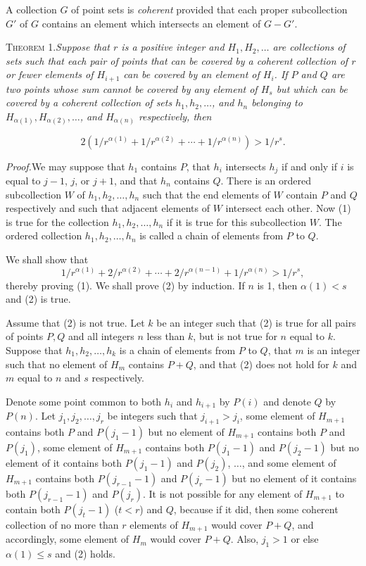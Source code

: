 \documentclass[11pt,a4paper,leqno,twoside]{article}
\newcommand{\thm}[2]{\par\medskip\noindent\textsc{Theorem #1.}\enspace\textit{#2}\par}
\newcommand{\proof}{\par\noindent\textit{Proof.}\enspace}
\begin{document}
A collection $G$ of point sets is \textit{coherent} provided that each proper subcollection $G'$ of $G$ contains an element which intersects an element of $G-G'$.

\thm{1}{Suppose that $r$ is a positive integer and $H_1,H_2,\ldots$ are collections of sets such that each pair of points that can be covered by a coherent collection of $r$ or fewer elements of $H_{i+1}$ can be covered by an element of $H_i$. If $P$ and $Q$ are two points whose sum cannot be covered by any element of $H_s$ but which can be covered by a coherent collection of sets $h_1,h_2,\ldots$, and $h_n$ belonging to $H_{\alpha(1)},H_{\alpha(2)},\ldots$, and $H_{\alpha(n)}$ respectively, then}
\begin{equation}\tag{1}2(1/r^{\alpha(1)}+1/r^{\alpha(2)}+\cdots+1/r^{\alpha(n)})>1/r^s.\end{equation}
\begingroup\renewcommand{\thefootnote}{}\endgroup
\newpage %
\proof We may suppose that $h_1$ contains $P$, that $h_i$ intersects $h_j$ if and only if $i$ is equal to $j-1$, $j$, or $j+1$, and that $h_n$ contains $Q$. There is an ordered subcollection $W$ of $h_1,h_2,\ldots,h_n$ such that the end elements of $W$ contain $P$ and $Q$ respectively and such that adjacent elements of $W$ intersect each other. Now (1) is true for the collection $h_1,h_2,\ldots,h_n$ if it is true for this subcollection $W$. The ordered collection $h_1,h_2,\ldots,h_n$ is called a chain of elements from $P$ to $Q$.

We shall show that
\begin{equation}\tag{2}1/r^{\alpha(1)}+2/r^{\alpha(2)}+\cdots+2/r^{\alpha(n-1)}+1/r^{\alpha(n)}>1/r^s,\end{equation}
thereby proving (1). We shall prove (2) by induction. If $n$ is 1, then $\alpha(1)<s$ and (2) is true.

Assume that (2) is not true. Let $k$ be an integer such that (2) is true for all pairs of points $P,Q$ and all integers $n$ less than $k$, but is not true for $n$ equal to $k$. Suppose that $h_1,h_2,\ldots,h_k$ is a chain of elements from $P$ to $Q$, that $m$ is an integer such that no element of $H_m$ contains $P+Q$, and that (2) does not hold for $k$ and $m$ equal to $n$ and $s$ respectively.

Denote some point common to both $h_i$ and $h_{i+1}$ by $P(i)$ and denote $Q$ by $P(n)$. Let $j_1,j_2,\ldots,j_r$ be integers such that $j_{i+1}>j_i$, some element of $H_{m+1}$ contains both $P$ and $P(j_1-1)$ but no element of $H_{m+1}$ contains both $P$ and $P(j_1)$, some element of $H_{m+1}$ contains both $P(j_1-1)$ and $P(j_2-1)$ but no element of it contains both $P(j_1-1)$ and $P(j_2)$, $\ldots$, and some element of $H_{m+1}$ contains both $P(j_{r-1}-1)$ and $P(j_r-1)$ but no element of it contains both $P(j_{r-1}-1)$ and $P(j_r)$. It is not possible for any element of $H_{m+1}$ to contain both $P(j_t-1)$ ($t<r$) and $Q$, because if it did, then some coherent collection of no more than $r$ elements of $H_{m+1}$ would cover $P+Q$, and accordingly, some element of $H_m$ would cover $P+Q$. Also, $j_1>1$ or else $\alpha(1)\leq s$ and (2) holds.
\end{document}
